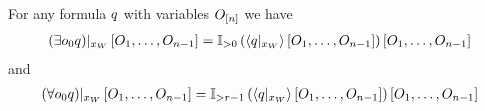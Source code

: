 \begin{theorem}
    For any formula $q$ with variables $O_{[n]}$ we have
    \begin{align*}
        {\left(\exists{o_{0}}q\right)}|_{x_{W}} \left[O_{1},\ldots,O_{n-1}\right] =
        {\mathbb{I}_{>0}}\left(\left\langle {q}|_{x_{W}}\right\rangle \left[ O_{1},\ldots,O_{n-1} \right]\right)\left[O_{1},\ldots,O_{n-1}\right]
    \end{align*}
    and
    \begin{align*}
        {\left(\forall{{o_{0}}} q\right)}|_{x_{W}} \left[O_{1},\ldots,O_{n-1}\right]=
        {\mathbb{I}_{>r-1}}\left(\left\langle {q}|_{x_{W}}\right\rangle \left[ O_{1},\ldots,O_{n-1} \right]\right)\left[O_{1},\ldots,O_{n-1}\right]
    \end{align*}
\end{theorem}
